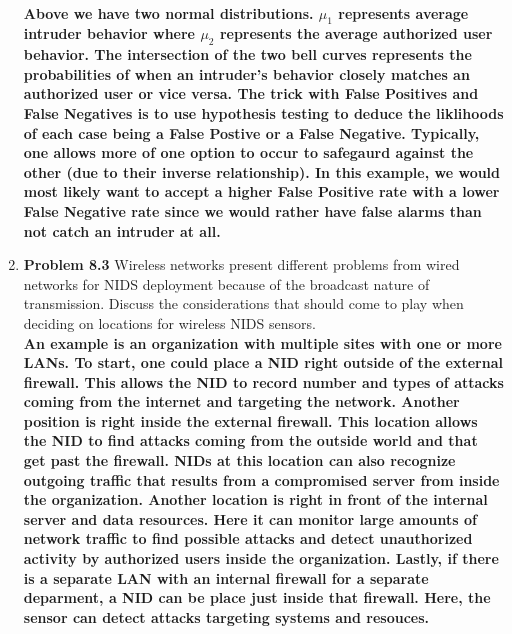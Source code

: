 \documentclass[12pt]{article}
\begin{document}
\begin{enumerate}
 \\

\textbf{Above we have two normal distributions. $\mu_1$ represents average intruder behavior where $\mu_2$ represents the average authorized user behavior. The intersection of the two bell curves represents the probabilities of when an intruder's behavior closely matches an authorized user or vice versa. The trick with False Positives and False Negatives is to use hypothesis testing to deduce the liklihoods of each case being a False Postive or a False Negative. Typically, one allows more of one option to occur to safegaurd against the other (due to their inverse relationship). In this example, we would most likely want to accept a higher False Positive rate with a lower False Negative rate since we would rather have false alarms than not catch an intruder at all.}


  \item \textbf{Problem 8.3} Wireless networks present different problems from wired networks for NIDS deployment because of the broadcast nature of transmission. Discuss the considerations that should come to play when deciding on locations for wireless NIDS sensors. \\

  \textbf{An example is an organization with multiple sites with one or more LANs. To start, one could place a NID right outside of the external firewall. This allows the NID to record number and types of attacks coming from the internet and targeting the network. Another position is right inside the external firewall. This location allows the NID to find attacks coming from the outside world and that get past the firewall. NIDs at this location can also recognize outgoing traffic that results from a compromised server from inside the organization. Another location is right in front of the internal server and data resources. Here it can monitor large amounts of network traffic to find possible attacks and detect unauthorized activity by authorized users inside the organization. Lastly, if there is a separate LAN with an internal firewall for a separate deparment, a NID can be place just inside that firewall. Here, the sensor can detect attacks targeting systems and resouces.} \\


\end{enumerate}
\end{document}
